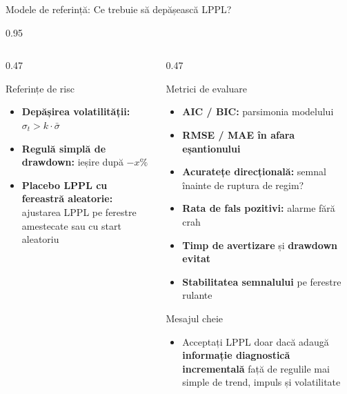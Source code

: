 \documentclass[9pt, aspectratio=169, t]{beamer}
\begin{document}
\begin{frame}{Modele de referință: Ce trebuie să depășească LPPL?}
\begin{cminipage}{0.95\textwidth}
{\begin{columns}[T]
\begin{column}{0.47\textwidth}
            \begin{exampleblock}{Referințe de risc}
                \begin{itemize}\setlength{\itemsep}{1pt}
                    \item \textbf{Depășirea volatilității:} $\sigma_t > k \cdot \bar{\sigma}$
                    \item \textbf{Regulă simplă de drawdown:} ieșire după $-x\%$
                    \item \textbf{Placebo LPPL cu fereastră aleatorie:} ajustarea LPPL pe ferestre amestecate sau cu start aleatoriu
                \end{itemize}
            \end{exampleblock}
        \end{column}
        \begin{column}{0.47\textwidth}
            \begin{alertblock}{Metrici de evaluare}
                \begin{itemize}\setlength{\itemsep}{0pt}
                    \item \textbf{AIC / BIC:} parsimonia modelului
                    \item \textbf{RMSE / MAE în afara eșantionului}
                    \item \textbf{Acuratețe direcțională:} semnal înainte de ruptura de regim?
                    \item \textbf{Rata de fals pozitivi:} alarme fără crah
                    \item \textbf{Timp de avertizare} și \textbf{drawdown evitat}
                    \item \textbf{Stabilitatea semnalului} pe ferestre rulante
                \end{itemize}
            \end{alertblock}
            \vspace{-2mm}
            \begin{block}{Mesajul cheie}
                \begin{itemize}\setlength{\itemsep}{0pt}
                    \item Acceptați LPPL doar dacă adaugă \textbf{informație diagnostică incrementală} față de regulile mai simple de trend, impuls și volatilitate
                \end{itemize}
            \end{block}
        \end{column}
    \end{columns}
    }
    \end{cminipage}
\end{frame}
\end{document}
